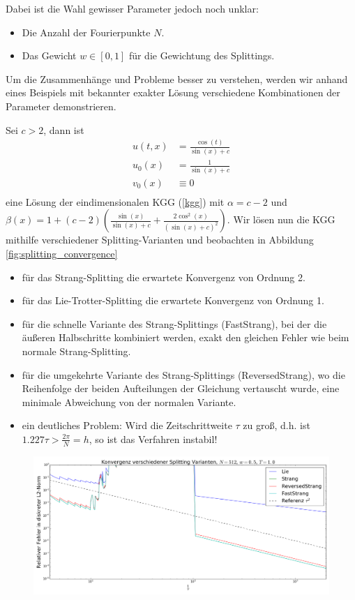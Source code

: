 Dabei ist die Wahl gewisser Parameter jedoch noch unklar:
\begin{itemize}
\item Die Anzahl der Fourierpunkte $N$.
\item Das Gewicht $w\in[0,1]$ für die Gewichtung des Splittings. 
\end{itemize}
Um die Zusammenhänge und Probleme besser zu verstehen, werden wir anhand eines Beispiels mit bekannter exakter Lösung verschiedene Kombinationen der Parameter demonstrieren.
\begin{mathbsp}
\label{bsp:trialfrog2}
Sei $c>2$, dann ist
\begin{align*}
u(t,x)&=\frac{\cos(t)}{\sin(x)+c}\\
u_0(x)&=\frac{1}{\sin(x)+c}\\
v_0(x)&\equiv 0\\
\end{align*}
eine Lösung der eindimensionalen KGG (\ref{kgg}) mit $\alpha=c-2$ und $\beta(x)=1+(c-2)\left(\frac{\sin(x)}{\sin(x)+c}+\frac{2\cos^2(x)}{(\sin(x)+c)^2}\right)$. Wir lösen nun die KGG mithilfe verschiedener Splitting-Varianten und beobachten in Abbildung \ref{fig:splitting_convergence}
\begin{itemize}
\item für das Strang-Splitting die erwartete Konvergenz von Ordnung 2.
\item für das Lie-Trotter-Splitting die erwartete Konvergenz von Ordnung 1.
\item für die schnelle Variante des Strang-Splittings (FastStrang), bei der die äußeren Halbschritte kombiniert werden, exakt den gleichen Fehler wie beim normale Strang-Splitting.
\item für die umgekehrte Variante des Strang-Splittings (ReversedStrang), wo die Reihenfolge der beiden Aufteilungen der Gleichung vertauscht wurde, eine minimale Abweichung von der normalen Variante.
\item ein deutliches Problem: Wird die Zeitschrittweite $\tau$ zu groß, d.h. ist $1.227\tau>\frac{2\pi}{N}=h$, so ist das Verfahren instabil!
\end{itemize}
\begin{figure}[!htb]
\includegraphics[width=\textwidth]{Figures/splitting_convergence_fix_weight_frog2_cfl.png}

\end{figure}
\end{mathbsp}

